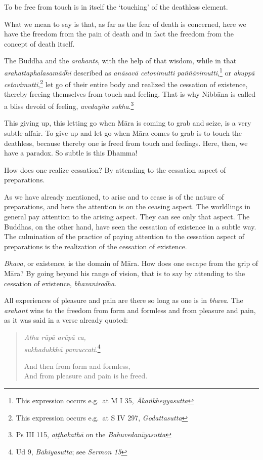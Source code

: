 To be free from touch is in itself the `touching' of the deathless element.

What we mean to say is that, as far as the fear of death is concerned, here we have the freedom from the pain of death and in fact the freedom from the concept of death itself.

The Buddha and the \emph{arahants}, with the help of that wisdom, while in that \emph{arahattaphalasamādhi} described as \emph{anāsavā cetovimutti paññāvimutti},\footnote{This expression occurs e.g.~at M I 35, \emph{Ākaṅkheyyasutta}} or \emph{akuppā cetovimutti},\footnote{This expression occurs e.g.~at S IV 297, \emph{Godattasutta}} let go of their entire body and realized the cessation of existence, thereby freeing themselves from touch and feeling. That is why Nibbāna is called a bliss devoid of feeling, \emph{avedayita sukha}.\footnote{Ps III 115, \emph{aṭṭhakathā} on the \emph{Bahuvedanīyasutta}}

This giving up, this letting go when Māra is coming to grab and seize, is a very subtle affair. To give up and let go when Māra comes to grab is to touch the deathless, because thereby one is freed from touch and feelings. Here, then, we have a paradox. So subtle is this Dhamma!

How does one realize cessation? By attending to the cessation aspect of preparations.

As we have already mentioned, to arise and to cease is of the nature of preparations, and here the attention is on the ceasing aspect. The worldlings in general pay attention to the arising aspect. They can see only that aspect. The Buddhas, on the other hand, have seen the cessation of existence in a subtle way. The culmination of the practice of paying attention to the cessation aspect of preparations is the realization of the cessation of existence.

\emph{Bhava}, or existence, is the domain of Māra. How does one escape from the grip of Māra? By going beyond his range of vision, that is to say by attending to the cessation of existence, \emph{bhavanirodha}.

All experiences of pleasure and pain are there so long as one is in \emph{bhava}. The \emph{arahant} wins to the freedom from form and formless and from pleasure and pain, as it was said in a verse already quoted:

\begin{quote}
\emph{Atha rūpā arūpā ca,}\\
\emph{sukhadukkhā pamuccati}.\footnote{Ud 9, \emph{Bāhiyasutta}; see \emph{Sermon 15}}

And then from form and formless,\\
And from pleasure and pain is he freed.
\end{quote}

